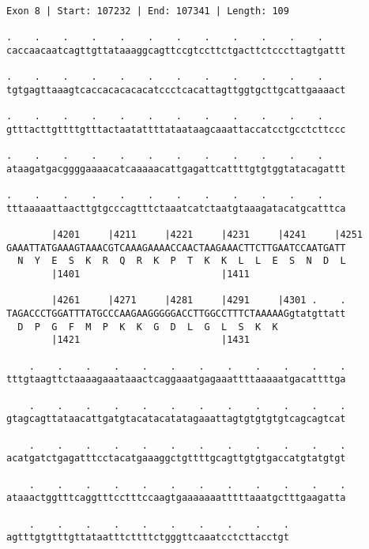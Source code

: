 \documentclass{article}
\begin{document}
\newpage
\begin{Verbatim}
Exon 8 | Start: 107232 | End: 107341 | Length: 109
 
.    .    .    .    .    .    .    .    .    .    .    .    
caccaacaatcagttgttataaaggcagttccgtccttctgacttctcccttagtgattt
  
.    .    .    .    .    .    .    .    .    .    .    .    
tgtgagttaaagtcaccacacacacatccctcacattagttggtgcttgcattgaaaact
  
.    .    .    .    .    .    .    .    .    .    .    .    
gtttacttgttttgtttactaatattttataataagcaaattaccatcctgcctcttccc
  
.    .    .    .    .    .    .    .    .    .    .    .    
ataagatgacggggaaaacatcaaaaacattgagattcattttgtgtggtatacagattt
  
.    .    .    .    .    .    .    .    .    .    .    .    
tttaaaaattaacttgtgcccagtttctaaatcatctaatgtaaagatacatgcatttca
  
        |4201     |4211     |4221     |4231     |4241     |4251
GAAATTATGAAAGTAAACGTCAAAGAAAACCAACTAAGAAACTTCTTGAATCCAATGATT
  N  Y  E  S  K  R  Q  R  K  P  T  K  K  L  L  E  S  N  D  L
        |1401                         |1411                 
  
        |4261     |4271     |4281     |4291     |4301 .    .
TAGACCCTGGATTTATGCCCAAGAAGGGGGACCTTGGCCTTTCTAAAAAGgtatgttatt
  D  P  G  F  M  P  K  K  G  D  L  G  L  S  K  K            
        |1421                         |1431                 
  
    .    .    .    .    .    .    .    .    .    .    .    .
tttgtaagttctaaaagaaataaactcaggaaatgagaaattttaaaaatgacattttga
  
    .    .    .    .    .    .    .    .    .    .    .    .
gtagcagttataacattgatgtacatacatatagaaattagtgtgtgtgtcagcagtcat
  
    .    .    .    .    .    .    .    .    .    .    .    .
acatgatctgagatttcctacatgaaaggctgttttgcagttgtgtgaccatgtatgtgt
  
    .    .    .    .    .    .    .    .    .    .    .    .
ataaactggtttcaggtttcctttccaagtgaaaaaaatttttaaatgctttgaagatta
  
    .    .    .    .    .    .    .    .    .    .
agtttgtgtttgttataatttcttttctgggttcaaatcctcttacctgt
\end{Verbatim}
\newpage
\end{document}
